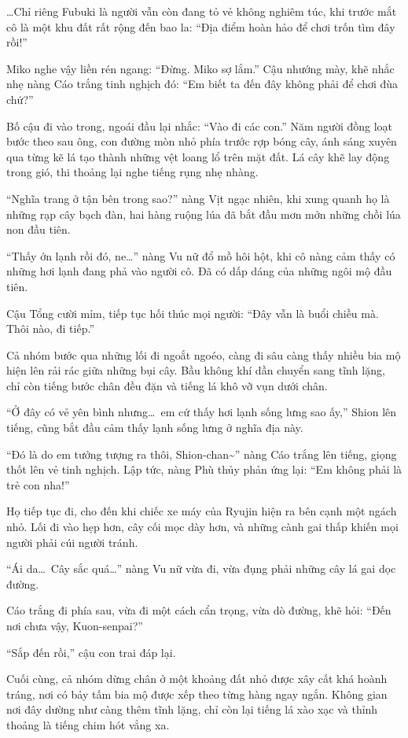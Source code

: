 \documentclass[../main.tex]{subfiles}
\begin{document}
\dots Chỉ riêng Fubuki là người vẫn còn đang tỏ vẻ không nghiêm túc, khi trước mắt cô là một khu đất rất rộng đến bao la: ``Địa điểm hoàn hảo để chơi trốn tìm đây rồi!''

Miko nghe vậy liền rén ngang: ``Đừng. Miko sợ lắm.'' Cậu nhướng mày, khẽ nhắc nhẹ nàng Cáo trắng tinh nghịch đó: ``Em biết ta đến đây không phải để chơi đùa chứ?''

Bố cậu đi vào trong, ngoái đầu lại nhắc: ``Vào đi các con.'' Năm người đồng loạt bước theo sau ông, con đường mòn nhỏ phía trước rợp bóng cây, ánh sáng xuyên qua từng kẽ lá tạo thành những vệt loang lổ trên mặt đất. Lá cây khẽ lay động trong gió, thi thoảng lại nghe tiếng rụng nhẹ nhàng.

``Nghĩa trang ở tận bên trong sao?'' nàng Vịt ngạc nhiên, khi xung quanh họ là những rạp cây bạch đàn, hai hàng ruộng lúa đã bắt đầu mơn mởn những chồi lúa non đầu tiên.

``Thấy ớn lạnh rồi đó, ne\dots'' nàng Vu nữ đổ mồ hôi hột, khi cô nàng cảm thấy có những hơi lạnh đang phả vào người cô. Đã có dấp dáng của những ngôi mộ đầu tiên.

Cậu Tổng cười mỉm, tiếp tục hối thúc mọi người: ``Đây vẫn là buổi chiều mà. Thôi nào, đi tiếp.''

Cả nhóm bước qua những lối đi ngoắt ngoéo, càng đi sâu càng thấy nhiều bia mộ hiện lên rải rác giữa những bụi cây. Bầu không khí dần chuyển sang tĩnh lặng, chỉ còn tiếng bước chân đều đặn và tiếng lá khô vỡ vụn dưới chân.

``Ở đây có vẻ yên bình nhưng\dots\ em cứ thấy hơi lạnh sống lưng sao ấy,'' Shion lên tiếng, cũng bắt đầu cảm thấy lạnh sống lưng ở nghĩa địa này.

``Đó là do em tưởng tượng ra thôi, Shion-chan\~{}'' nàng Cáo trắng lên tiếng, giọng thốt lên vẻ tinh nghịch. Lập tức, nàng Phù thủy phản ứng lại: ``Em không phải là trẻ con nha!''

Họ tiếp tục đi, cho đến khi chiếc xe máy của Ryujin hiện ra bên cạnh một ngách nhỏ. Lối đi vào hẹp hơn, cây cối mọc dày hơn, và những cành gai thấp khiến mọi người phải cúi người tránh.

``Ái da\dots\ Cây sắc quá\dots'' nàng Vu nữ vừa đi, vừa đụng phải những cây lá gai dọc đường.

Cáo trắng đi phía sau, vừa đi một cách cẩn trọng, vừa dò đường, khẽ hỏi: ``Đến nơi chưa vậy, Kuon-senpai?''

``Sắp đến rồi,'' cậu con trai đáp lại.

Cuối cùng, cả nhóm dừng chân ở một khoảng đất nhỏ được xây cất khá hoành tráng, nơi có bảy tấm bia mộ được xếp theo từng hàng ngay ngắn. Không gian nơi đây dường như càng thêm tĩnh lặng, chỉ còn lại tiếng lá xào xạc và thỉnh thoảng là tiếng chim hót vẳng xa.
\end{document}
